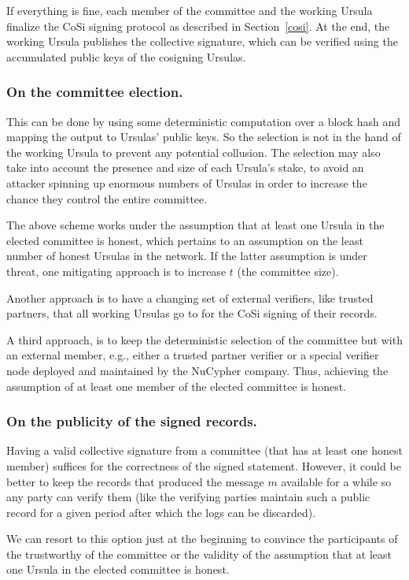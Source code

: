 If everything is fine, each member of the committee and the working 
Ursula finalize the CoSi signing protocol as described in Section~\ref{cosi}. 
At the end, the working Ursula publishes the collective signature, which can be 
verified using the accumulated public keys of the cosigning Ursulas.


\subsubsection{On the committee election.} This can be done 
by using some deterministic computation over a block hash and mapping 
the output to Ursulas' public keys. So the selection is not in the hand of the 
working Ursula to prevent any potential collusion. The selection may also take into account the presence and size of each Ursula's stake, to avoid an attacker spinning up enormous numbers of Ursulas in order to increase the chance they control the entire committee.


The above scheme works under the assumption that at least one Ursula 
in the elected committee is honest, which pertains to an assumption on the 
least number of honest Ursulas in the network. If the latter assumption is under threat, one mitigating approach is to increase $t$ (the committee size).


Another approach is to have a changing set of external verifiers, like 
trusted partners, that all working Ursulas go to for the CoSi signing 
of their records. 


A third approach, is to keep the deterministic selection of the committee 
but with an external member, e.g., either a trusted partner verifier 
or a special verifier node deployed and maintained by the NuCypher company. 
Thus, achieving the assumption of at least one member of the elected 
committee is honest.


\subsubsection{On the publicity of the signed records.} Having a 
valid collective signature from a committee (that has at least one honest 
member) suffices for the correctness of the signed statement. However, 
it could be better to keep the records that produced the message $m$  
available for a while so any party can verify them (like the verifying 
parties maintain such a public record for a given period after which 
the logs can be discarded). 


We can resort to this option just at the beginning to convince the 
participants of the trustworthy of the committee or the validity of the 
assumption that at least one Ursula in the elected committee is honest.


